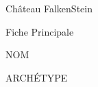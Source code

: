 \documentclass[a5paper]{letter}
\begin{document}



{\centering \Huge{Château FalkenStein}~\\
{\centering \large{Fiche Principale}~\\


\begin{minipage}[ht]{0.48\textwidth}
	NOM~\newline~\newline
\end{minipage} \hfill \begin{minipage}[ht]{0.48\textwidth}
	ARCHÉTYPE~\newline~\newline
\end{minipage}~\\~\\


}}
\end{document}
